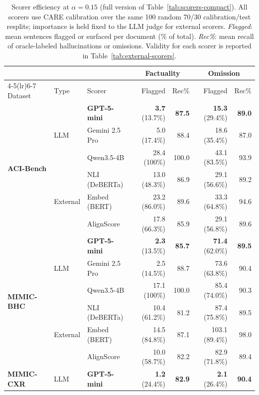 \begin{table}[t]
\centering
\small
\setlength{\tabcolsep}{4pt}
\caption{Scorer efficiency at $\alpha=0.15$ (full version of Table~\ref{tab:scorers-compact}). All scorers use \textsc{CARE} calibration over the same 100 random 70/30 calibration/test resplits; importance is held fixed to the LLM judge for external scorers. \emph{Flagged}: mean sentences flagged or surfaced per document (\% of total). \emph{Rec\%}: mean recall of oracle-labeled hallucinations or omissions. Validity for each scorer is reported in Table~\ref{tab:external-scorers}.}
\label{tab:external-scorers-efficiency}
\begin{tabular}{lll rr rr}
\toprule
 & & & \multicolumn{2}{c}{Factuality} & \multicolumn{2}{c}{Omission} \\
\cmidrule(lr){4-5}\cmidrule(lr){6-7}
Dataset & Type & Scorer & Flagged & Rec\% & Flagged & Rec\% \\
\midrule
  \multirow{6}{*}{\textbf{ACI-Bench}} & \multirow{3}{*}{LLM} & \textbf{GPT-5-mini} & \textbf{3.7} (13.7\%) & \textbf{87.5} & \textbf{15.3} (29.4\%) & \textbf{89.0} \\
   &  & Gemini 2.5 Pro & 5.0 (17.4\%) & 88.4 & 18.6 (35.4\%) & 87.0 \\
   &  & Qwen3.5-4B & 28.4 (100\%) & 100.0 & 43.1 (83.5\%) & 93.9 \\
\addlinespace[2pt]
   & \multirow{3}{*}{External} & NLI (DeBERTa) & 13.0 (48.3\%) & 86.9 & 29.1 (56.6\%) & 89.2 \\
   &  & Embed (BERT) & 23.2 (86.0\%) & 89.6 & 33.3 (64.8\%) & 94.6 \\
   &  & AlignScore & 17.8 (66.3\%) & 85.9 & 29.1 (56.8\%) & 89.6 \\
\midrule
  \multirow{6}{*}{\textbf{MIMIC-BHC}} & \multirow{3}{*}{LLM} & \textbf{GPT-5-mini} & \textbf{2.3} (13.5\%) & \textbf{85.7} & \textbf{71.4} (62.0\%) & \textbf{89.5} \\
   &  & Gemini 2.5 Pro & 2.5 (14.5\%) & 88.7 & 73.6 (63.8\%) & 90.4 \\
   &  & Qwen3.5-4B & 17.1 (100\%) & 100.0 & 85.4 (74.0\%) & 90.3 \\
\addlinespace[2pt]
   & \multirow{3}{*}{External} & NLI (DeBERTa) & 10.4 (61.2\%) & 81.2 & 87.4 (75.8\%) & 89.5 \\
   &  & Embed (BERT) & 14.5 (84.8\%) & 87.1 & 103.1 (89.4\%) & 98.0 \\
   &  & AlignScore & 10.0 (58.7\%) & 82.2 & 82.9 (71.8\%) & 89.4 \\
\midrule
  \multirow{4}{*}{\textbf{MIMIC-CXR}} & LLM & \textbf{GPT-5-mini} & \textbf{1.2} (24.4\%) & \textbf{82.9} & \textbf{2.1} (26.4\%) & \textbf{90.4} \\

\end{tabular}
\end{table}
